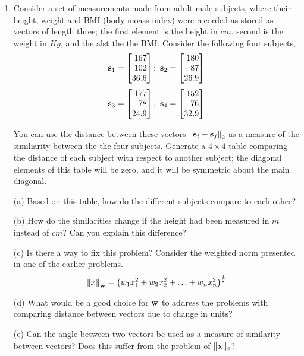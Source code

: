 \documentclass[12pt]{article}
\def\mf{\ensuremath\mathbf}
\begin{document}
\begin{enumerate}
    \item Consider a set of measurements made from adult male subjects, where their height, weight and BMI (body moass index) were recorded as stored as vectors of length three; the first element is the height in $cm$, second is the weight in $Kg$, and the alst the the BMI. Consider the following four subjects,
    \[ \mf{s}_1 =  \begin{bmatrix*}[r]167\\102\\36.6\end{bmatrix*}; \,\,
    \mf{s}_2 =  \begin{bmatrix*}[r]180\\87\\26.9\end{bmatrix*} \]
    \[ \mf{s}_3 =  \begin{bmatrix*}[r]177\\78\\24.9\end{bmatrix*}; \,\,
    \mf{s}_4 =  \begin{bmatrix*}[r]152\\76\\32.9\end{bmatrix*} \]

    You can use the distance between these vectors $\left\lVert \mf{s}_i - \mf{s}_j\right\rVert_2$ as a measure of the similiarity between the the four subjects. Generate a $4 \times 4$ table comparing the distance of each subject with respect to another subject; the diagonal elements of this table will be zero, and it will be symmetric about the main diagonal. 

    (a) Based on this table, how do the different subjects compare to each other?

    (b) How do the similarities change if the height had been measured in $m$ instead of $cm$? Can you explain this difference?

    (c) Is there a way to fix this problem? Consider the weighted norm presented in one of the earlier problems.
    \[ \left\lVert x \right\rVert_\mf{w} = \left(w_1x_1^2 + w_2x_2^2 + \ldots + w_nx_n^2\right)^{\frac{1}{2}} \]

    (d) What would be a good choice for $\mf{w}$ to address the problems with comparing distance between vectors due to change in units?

    (e) Can the angle between two vectors be used as a measure of similarity between vectors? Does this suffer from the problem of $\left\lVert \mf{x} \right\rVert_2$?
\end{enumerate}
\end{document}
